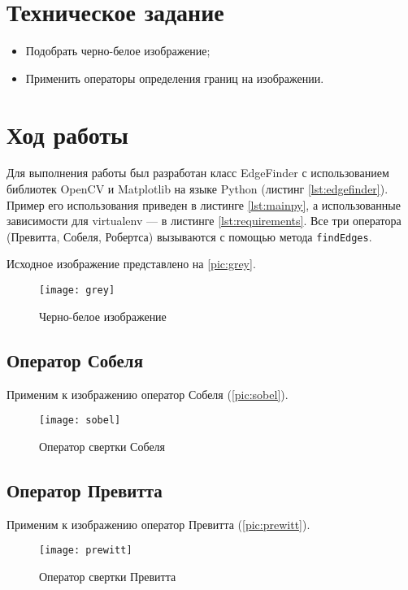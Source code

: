 \section{Техническое задание}

\begin{itemize}
	\item Подобрать черно-белое изображение;
	\item Применить операторы определения границ на изображении.
\end{itemize}

\section{Ход работы}

Для выполнения работы был разработан класс EdgeFinder с использованием библиотек OpenCV и Matplotlib на языке Python (листинг \vref{lst:edgefinder}). Пример его использования приведен в листинге \cref{lst:mainpy}, а использованные зависимости для virtualenv --- в листинге \cref{lst:requirements}. Все три оператора (Превитта, Собеля, Робертса) вызываются с помощью метода \texttt{findEdges}.

Исходное изображение представлено на \vref{pic:grey}.

\begin{figure}[H]
	\centering
	\texttt{[image: grey]}
	\caption{Черно-белое изображение}
	\label{pic:grey}
\end{figure}

\subsection{Оператор Собеля}

Применим к изображению оператор Собеля (\vref{pic:sobel}).

\begin{figure}[H]
	\centering
	\texttt{[image: sobel]}
	\caption{Оператор свертки Собеля}
	\label{pic:sobel}
\end{figure}

\subsection{Оператор Превитта}

Применим к изображению оператор Превитта (\vref{pic:prewitt}).

\begin{figure}[H]
	\centering
	\texttt{[image: prewitt]}
	\caption{Оператор свертки Превитта}
	\label{pic:prewitt}
\end{figure}

